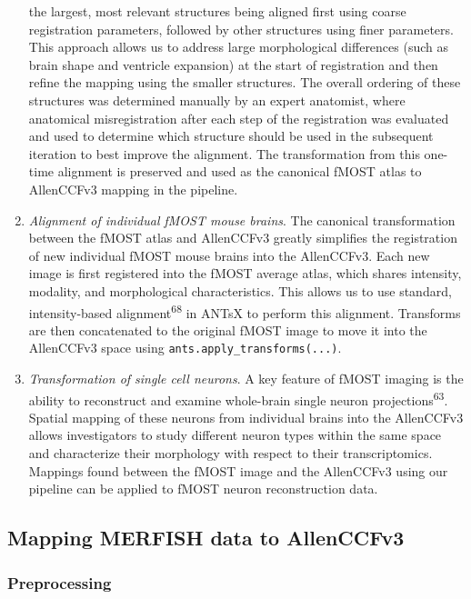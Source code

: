\documentclass[
  12pt,
]{article}
\begin{document}
\begin{enumerate}
  the largest, most relevant structures being aligned first using coarse
  registration parameters, followed by other structures using finer
  parameters. This approach allows us to address large morphological
  differences (such as brain shape and ventricle expansion) at the start
  of registration and then refine the mapping using the smaller
  structures. The overall ordering of these structures was determined
  manually by an expert anatomist, where anatomical misregistration
  after each step of the registration was evaluated and used to
  determine which structure should be used in the subsequent iteration
  to best improve the alignment. The transformation from this one-time
  alignment is preserved and used as the canonical fMOST atlas to
  AllenCCFv3 mapping in the pipeline.
\item
  \emph{Alignment of individual fMOST mouse brains}. The canonical
  transformation between the fMOST atlas and AllenCCFv3 greatly
  simplifies the registration of new individual fMOST mouse brains into
  the AllenCCFv3. Each new image is first registered into the fMOST
  average atlas, which shares intensity, modality, and morphological
  characteristics. This allows us to use standard, intensity-based
  alignment\textsuperscript{68} in ANTsX to perform this alignment.
  Transforms are then concatenated to the original fMOST image to move
  it into the AllenCCFv3 space using
  \texttt{ants.apply\_transforms(...)}.
\item
  \emph{Transformation of single cell neurons}. A key feature of fMOST
  imaging is the ability to reconstruct and examine whole-brain single
  neuron projections\textsuperscript{63}. Spatial mapping of these
  neurons from individual brains into the AllenCCFv3 allows
  investigators to study different neuron types within the same space
  and characterize their morphology with respect to their
  transcriptomics. Mappings found between the fMOST image and the
  AllenCCFv3 using our pipeline can be applied to fMOST neuron
  reconstruction data.
\end{enumerate}

\hypertarget{mapping-merfish-data-to-allenccfv3}{%
\subsection{Mapping MERFISH data to
AllenCCFv3}\label{mapping-merfish-data-to-allenccfv3}}

\hypertarget{preprocessing-1}{%
\subsubsection{Preprocessing}\label{preprocessing-1}}
\end{document}

